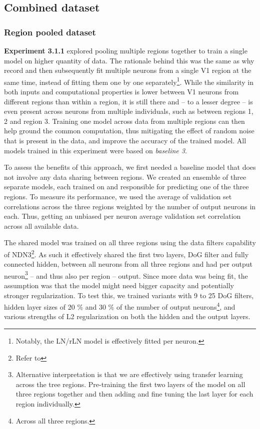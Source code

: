 \subsection{Combined dataset}\label{ch:5.3.1}
\subsubsection{Region pooled dataset}

\textbf{Experiment 3.1.1} explored pooling multiple regions together to train a single model on higher quantity of data. The rationale behind this was the same as why record and then subsequently fit multiple neurons from a single V1 region at the same time, instead of fitting them one by one separately\footnote{Notably, the LN/rLN model is effectively fitted per neuron.}. While the similarity in both inputs and computational properties is lower between V1 neurons from different regions than within a region, it is still there and -- to a lesser degree -- is even present across neurons from multiple individuals, such as between {regions 1}, {2} and {region 3}. Training one model across data from multiple regions can then help ground the common computation, thus mitigating the effect of random noise that is present in the data, and improve the accuracy of the trained model. All models trained in this experiment were based on \textit{baseline 3}. 

To assess the benefits of this approach, we first needed a baseline model that does not involve any data sharing between regions. We created an ensemble of three separate models, each trained on and responsible for predicting one of the three regions. To measure its performance, we used the average of validation set correlations across the three regions weighted by the number of output neurons in each. Thus, getting an unbiased per neuron average validation set correlation across all available data.

The shared model was trained on all three regions using the data filters capability of NDN3\footnote{Refer to }. As such it effectively shared the first two layers, DoG filter and fully connected hidden, between all neurons from all three regions and had per output neuron\footnote{Alternative interpretation is that we are effectively using transfer learning across the tree regions. Pre-training the first two layers of the model on all three regions together and then adding and fine tuning the last layer for each region individually.} -- and thus also per region -- output. Since more data was being fit, the assumption was that the model might need bigger capacity and potentially stronger regularization. To test this, we trained variants with 9 to 25 DoG filters, hidden layer sizes of 20 \% and 30 \% of the number of output neurons\footnote{Across all three regions.}, and various strengths of L2 regularization on both the hidden and the output layers. 

